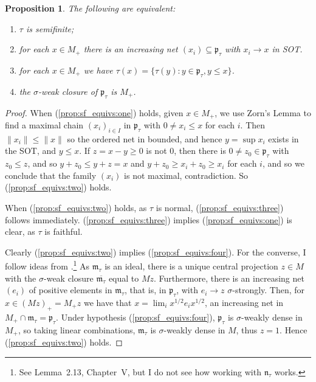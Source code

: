 \documentclass[a4paper,11pt]{article}
\newcommand{\mf}[1]{{\mathfrak{#1}}}
\newtheorem{proposition}[lemma]{Proposition}
\theoremstyle{definition}
\begin{document}
\begin{proposition}\label{prop:sf_equivs}
The following are equivalent:
\begin{enumerate}
  \item\label{prop:sf_equivs:one} $\tau$ is semifinite;
  \item\label{prop:sf_equivs:two} for each $x\in M_+$ there is an increasing net $(x_i) \subseteq\mf p_\tau$ with $x_i\to x$ in SOT.
  \item\label{prop:sf_equivs:three} for each $x\in M_+$ we have $\tau(x) = \{ \tau(y) : y\in\mf p_\tau, y\leq x \}$.
  \item\label{prop:sf_equivs:four} the $\sigma$-weak closure of $\mf p_\tau$ is $M_+$.
\end{enumerate}
\end{proposition}
\begin{proof}
When (\ref{prop:sf_equivs:one}) holds, given $x\in M_+$, we use Zorn's Lemma to find a maximal chain $(x_i)_{i\in I}$ in $\mf p_\tau$ with $0\not=x_i\leq x$ for each $i$.  Then $\|x_i\| \leq \|x\|$ so the ordered net in bounded, and hence $y=\sup x_i$ exists in the SOT, and $y\leq x$.  If $z=x-y\geq 0$ is not $0$, then there is $0\not=z_0 \in \mf p_\tau$ with $z_0\leq z$, and so $y+z_0 \leq y+z = x$ and $y+z_0 \geq x_i+z_0 \geq x_i$ for each $i$, and so we conclude that the family $(x_i)$ is not maximal, contradiction.  So (\ref{prop:sf_equivs:two}) holds.

When (\ref{prop:sf_equivs:two}) holds, as $\tau$ is normal, (\ref{prop:sf_equivs:three}) follows immediately.  (\ref{prop:sf_equivs:three}) implies (\ref{prop:sf_equivs:one}) is clear, as $\tau$ is faithful.

Clearly (\ref{prop:sf_equivs:two}) implies (\ref{prop:sf_equivs:four}).
For the converse, I follow ideas from \cite{TakesakiI}.\footnote{See Lemma~2.13, Chapter~V, but I do not see how working with $\mf n_\tau$ works.}  As $\mf m_\tau$ is an ideal, there is a unique central projection $z\in M$ with the $\sigma$-weak closure $\overline{\mf m_\tau}$ equal to $Mz$.  Furthermore, there is an increasing net $(e_i)$ of positive elements in $\mf m_\tau$, that is, in $\mf p_\tau$, with $e_i \to z$ $\sigma$-strongly.  Then, for $x\in (Mz)_+ = M_+z$ we have that $x = \lim_i x^{1/2} e_i x^{1/2}$, an increasing net in $M_+ \cap \mf m_\tau = \mf p_\tau$.  Under hypothesis (\ref{prop:sf_equivs:four}), $\mf p_\tau$ is $\sigma$-weakly dense in $M_+$, so taking linear combinations, $\mf m_\tau$ is $\sigma$-weakly dense in $M$, thus $z=1$.  Hence (\ref{prop:sf_equivs:two}) holds.
\end{proof}
\end{document}
